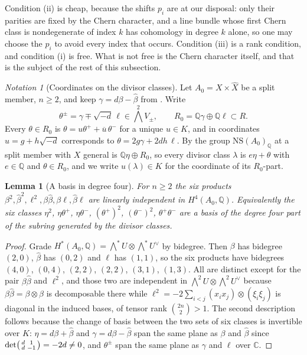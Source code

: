 \documentclass[11pt,reqno]{amsart}
\theoremstyle{plain}
\newtheorem{lemma}[theorem]{Lemma}
\theoremstyle{definition}
\theoremstyle{remark}
\newtheorem{notation}[theorem]{Notation}
\newcommand{\QQ}{\mathbb{Q}}
\newcommand{\CC}{\mathbb{C}}
\newcommand{\NS}{\mathrm{NS}}
\newcommand{\bbar}[1]{\overline{#1}}
\begin{document}
Condition (ii) is cheap, because the shifts $p_{i}$ are at our disposal: only
their parities are fixed by the Chern character, and a line bundle whose first
Chern class is nondegenerate of index $k$ has cohomology in degree $k$ alone,
so one may choose the $p_{i}$ to avoid every index that occurs. Condition
(iii) is a rank condition, and condition (i) is free. What is not free is the
Chern character itself, and that is the subject of the rest of this
subsection.

\begin{notation}[Coordinates on the divisor classes]\label{not:splitcoords}
Let $A_{0}=X\times\widehat{X}$ be a split member, $n\ge2$, and keep
$\gamma=d\beta-\widehat{\beta}$ from \cite[Notation~15.1]{paperI}. Write
\[
  \theta^{\pm}=\gamma\mp\sqrt{-d}\,\ell\in\textstyle\bigwedge^{2}V_{\pm},
  \qquad
  R_{0}=\QQ\gamma\oplus\QQ\ell\subset R .
\]
Every $\theta\in R_{0}$ is $\theta=u\theta^{+}+\bbar u\,\theta^{-}$ for a
unique $u\in K$, and in coordinates $u=g+h\sqrt{-d}$ corresponds to
$\theta=2g\gamma+2dh\,\ell$. By \cite[Proposition~15.19(iv)]{paperI} the group
$\NS(A_{0})_{\QQ}$ at a split member with $X$ general is
$\QQ\eta\oplus R_{0}$, so every divisor class $\lambda$ is $e\eta+\theta$ with
$e\in\QQ$ and $\theta\in R_{0}$, and we write $u(\lambda)\in K$ for the
coordinate of its $R_{0}$-part.
\end{notation}

\begin{lemma}[A basis in degree four]\label{lem:sixmonomials}
For $n\ge2$ the six products
$\beta^{2},\widehat\beta^{2},\ell^{2},\beta\widehat\beta,\beta\ell,
\widehat\beta\ell$
are linearly independent in $H^{4}(A_{0},\QQ)$. Equivalently the six classes
$\eta^{2}$, $\eta\theta^{+}$, $\eta\theta^{-}$, $(\theta^{+})^{2}$,
$(\theta^{-})^{2}$, $\theta^{+}\theta^{-}$ are a basis of the degree four part
of the subring generated by the divisor classes.
\end{lemma}

\begin{proof}
Grade $H^{*}(A_{0},\QQ)=\bigwedge^{*}U\otimes\bigwedge^{*}U^{\vee}$ by
bidegree. Then $\beta$ has bidegree $(2,0)$, $\widehat\beta$ has $(0,2)$ and
$\ell$ has $(1,1)$, so the six products have bidegrees $(4,0)$, $(0,4)$,
$(2,2)$, $(2,2)$, $(3,1)$, $(1,3)$. All are distinct except for the pair
$\beta\widehat\beta$ and $\ell^{2}$, and those two are independent in
$\bigwedge^{2}U\otimes\bigwedge^{2}U^{\vee}$ because
$\beta\widehat\beta=\beta\otimes\widehat\beta$ is decomposable there while
$\ell^{2}=-2\sum_{i<j}(x_{i}x_{j})\otimes(\xi_{i}\xi_{j})$ is diagonal in
the induced bases, of tensor rank $\binom{2n}{2}>1$. The second
description follows because the change of basis between the two sets of six
classes is invertible over $K$: $\eta=d\beta+\widehat\beta$ and
$\gamma=d\beta-\widehat\beta$ span the same plane as
$\beta$ and $\widehat\beta$ since $\det\begin{psmallmatrix}d&1\\
d&-1\end{psmallmatrix}=-2d\ne0$, and $\theta^{\pm}$ span the same plane
as $\gamma$ and $\ell$ over $\CC$.
\end{proof}
\end{document}
